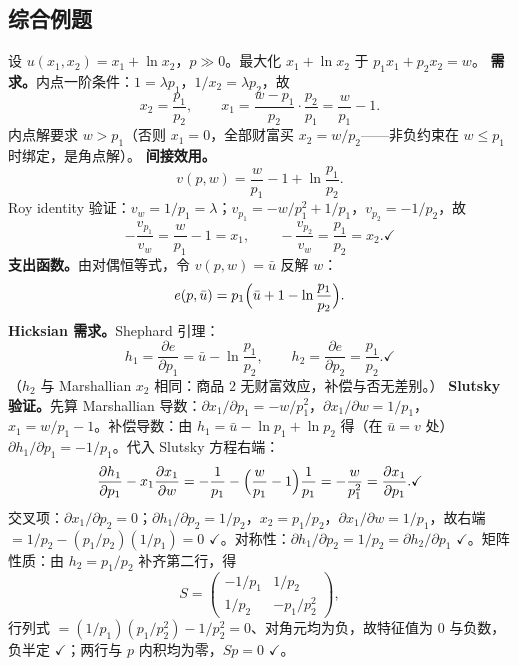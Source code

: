 \subsection{综合例题}

\begin{example}\label{ex:quasilinear}
设 $u(x_1,x_2)=x_1+\ln x_2$，$p\gg0$。最大化 $x_1+\ln x_2$ 于 $p_1x_1+p_2x_2=w$。
\textbf{需求。}内点一阶条件：$1=\lambda p_1$，$1/x_2=\lambda p_2$，故
\[
 x_2=\frac{p_1}{p_2},\qquad
 x_1=\frac{w-p_1}{p_2}\cdot\frac{p_2}{p_1}=\frac{w}{p_1}-1 .
\]
内点解要求 $w>p_1$（否则 $x_1=0$，全部财富买 $x_2=w/p_2$——非负约束在 $w\le p_1$ 时绑定，是角点解）。
\textbf{间接效用。}
\[
 v(p,w)=\frac{w}{p_1}-1+\ln\frac{p_1}{p_2}.
\]
Roy identity 验证：$v_w=1/p_1=\lambda$；$v_{p_1}=-w/p_1^2+1/p_1$，$v_{p_2}=-1/p_2$，故
\[
 -\frac{v_{p_1}}{v_w}=\frac{w}{p_1}-1=x_1,\qquad
 -\frac{v_{p_2}}{v_w}=\frac{p_1}{p_2}=x_2 .\checkmark
\]
\textbf{支出函数。}由对偶恒等式，令 $v(p,w)=\bar u$ 反解 $w$：
\[
 e(p,\bar u)=p_1\Bigl(\bar u+1-\ln\frac{p_1}{p_2}\Bigr).
\]
\textbf{Hicksian 需求。}Shephard 引理：
\[
 h_1=\frac{\partial e}{\partial p_1}=\bar u-\ln\frac{p_1}{p_2},\qquad
 h_2=\frac{\partial e}{\partial p_2}=\frac{p_1}{p_2}.\checkmark
\]
（$h_2$ 与 Marshallian $x_2$ 相同：商品 $2$ 无财富效应，补偿与否无差别。）
\textbf{Slutsky 验证。}先算 Marshallian 导数：$\partial x_1/\partial p_1=-w/p_1^2$，$\partial x_1/\partial w=1/p_1$，$x_1=w/p_1-1$。补偿导数：由 $h_1=\bar u-\ln p_1+\ln p_2$ 得（在 $\bar u=v$ 处）$\partial h_1/\partial p_1=-1/p_1$。代入 Slutsky 方程右端：
\[
 \frac{\partial h_1}{\partial p_1}-x_1\frac{\partial x_1}{\partial w}
 =-\frac{1}{p_1}-\Bigl(\frac{w}{p_1}-1\Bigr)\frac{1}{p_1}
 =-\frac{w}{p_1^2}
 =\frac{\partial x_1}{\partial p_1} .\checkmark
\]
交叉项：$\partial x_1/\partial p_2=0$；$\partial h_1/\partial p_2=1/p_2$，$x_2=p_1/p_2$，$\partial x_1/\partial w=1/p_1$，故右端 $=1/p_2-(p_1/p_2)(1/p_1)=0$ $\checkmark$。对称性：$\partial h_1/\partial p_2=1/p_2=\partial h_2/\partial p_1$ $\checkmark$。矩阵性质：由 $h_2=p_1/p_2$ 补齐第二行，得
\[
 S=\begin{pmatrix}
 -1/p_1 & 1/p_2\\
 1/p_2 & -p_1/p_2^2
 \end{pmatrix},
\]
行列式 $=(1/p_1)(p_1/p_2^2)-1/p_2^2=0$、对角元均为负，故特征值为 $0$ 与负数，负半定 $\checkmark$；两行与 $p$ 内积均为零，$Sp=0$ $\checkmark$。
\end{example}


